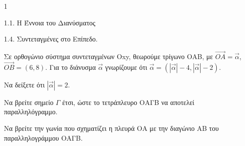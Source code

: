 \begin{ylh}{1}
    \item 1.1. Η Έννοια του Διανύσματος
    \item 1.4. Συντεταγμένες στο Επίπεδο.
\end{ylh}
Σε ορθογώνιο σύστημα συντεταγμένων Oxy, θεωρούμε τρίγωνο ΟΑΒ, με $\overrightarrow{OA} = \vec{\alpha}$, $\overrightarrow{OB} = (6,8)$. Για το διάνυσμα $\vec{\alpha}$ γνωρίζουμε ότι $\vec{\alpha} = (|\vec{\alpha}| - 4, |\vec{\alpha}| - 2)$.

\begin{alist}
    \item Να δείξετε ότι $|\vec{\alpha}| = 2$. 
    \item Να βρείτε σημείο $\Gamma$ έτσι, ώστε το τετράπλευρο ΟΑΓΒ να αποτελεί παραλληλόγραμμο. 
    \item Να βρείτε την γωνία που σχηματίζει η πλευρά ΟΑ με την διαγώνιο ΑΒ του παραλληλογράμμου ΟΑΓΒ. 
\end{alist}